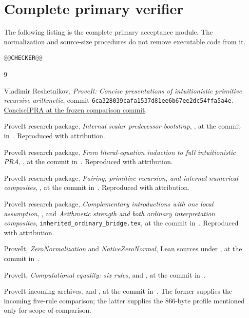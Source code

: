 \clearpage
\section{Complete primary verifier}

The following listing is the complete primary acceptance module.
The normalization and source-size procedures do not remove executable
code from it.

\begin{lstlisting}[language=Python]
@@CHECKER@@
\end{lstlisting}

\clearpage
\begin{thebibliography}{9}
\raggedright
{}
Vladimir Reshetnikov, \emph{ProveIt: Concise presentations of
intuitionistic primitive recursive arithmetic}, commit
\texttt{6ca328039cafa1537d81ee6b67ee2dc54ffa5a4e}.
\href{https://github.com/VladimirReshetnikov/ProveIt/tree/6ca328039cafa1537d81ee6b67ee2dc54ffa5a4e/Logic/PrimitiveRecursiveArithmetic/ConciseIPRA}{ConciseIPRA at the frozen comparison commit}.

ProveIt research package, \emph{Internal scalar predecessor bootstrap},
,
at the commit in~\cite{baseline}. Reproduced with attribution.

ProveIt research package, \emph{From literal-equation induction to
full intuitionistic PRA},
,
at the commit in~\cite{baseline}. Reproduced with attribution.

ProveIt research package, \emph{Pairing, primitive recursion, and
internal numerical composites},
,
at the commit in~\cite{baseline}. Reproduced with attribution.

ProveIt research package, \emph{Complementary introductions with
one local assumption},
,
and \emph{Arithmetic strength and both ordinary interpretation
composites},
\texttt{inherited\_ordinary\_bridge.tex},
at the commit in~\cite{baseline}. Reproduced with attribution.

ProveIt, \emph{ZeroNormalization} and \emph{NativeZeroNormal},
Lean sources under , at the commit
in~\cite{baseline}.

ProveIt, \emph{Computational equality: six rules},
 and
, at the commit
in~\cite{baseline}.

ProveIt incoming archives,
 and
,
at the commit in~\cite{baseline}. The former supplies the incoming
five-rule comparison; the latter supplies the 866-byte profile
mentioned only for scope of comparison.
\end{thebibliography}

